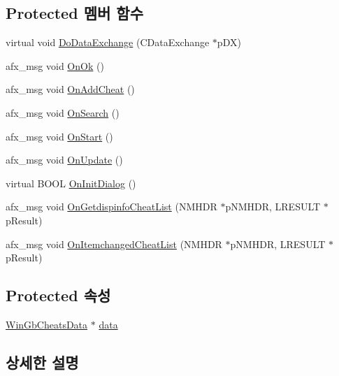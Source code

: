 \subsection*{Protected 멤버 함수}
\begin{DoxyCompactItemize}
\item 
virtual void \mbox{\hyperlink{class_g_b_cheat_search_ab867411287037dfaee49451bb149d5ad}{Do\+Data\+Exchange}} (C\+Data\+Exchange $\ast$p\+DX)
\item 
afx\+\_\+msg void \mbox{\hyperlink{class_g_b_cheat_search_a8a4503d0b05a2061a281f01b6e23f586}{On\+Ok}} ()
\item 
afx\+\_\+msg void \mbox{\hyperlink{class_g_b_cheat_search_acd735709495f4e21e284a4442886152a}{On\+Add\+Cheat}} ()
\item 
afx\+\_\+msg void \mbox{\hyperlink{class_g_b_cheat_search_acdfee4ab94748a31036cd473c60a4573}{On\+Search}} ()
\item 
afx\+\_\+msg void \mbox{\hyperlink{class_g_b_cheat_search_add94032f04d4e03bee943d9a7051df20}{On\+Start}} ()
\item 
afx\+\_\+msg void \mbox{\hyperlink{class_g_b_cheat_search_a9e91910287e7ff53576af9b32de875ad}{On\+Update}} ()
\item 
virtual B\+O\+OL \mbox{\hyperlink{class_g_b_cheat_search_a8aba3602d876fba97b2ef5195dc0b648}{On\+Init\+Dialog}} ()
\item 
afx\+\_\+msg void \mbox{\hyperlink{class_g_b_cheat_search_ae7ab3b9b14715f3984bdef66ed321e1f}{On\+Getdispinfo\+Cheat\+List}} (N\+M\+H\+DR $\ast$p\+N\+M\+H\+DR, L\+R\+E\+S\+U\+LT $\ast$p\+Result)
\item 
afx\+\_\+msg void \mbox{\hyperlink{class_g_b_cheat_search_af1edf086e30536c43b13528e4114ebc2}{On\+Itemchanged\+Cheat\+List}} (N\+M\+H\+DR $\ast$p\+N\+M\+H\+DR, L\+R\+E\+S\+U\+LT $\ast$p\+Result)
\end{DoxyCompactItemize}
\subsection*{Protected 속성}
\begin{DoxyCompactItemize}
\item 
\mbox{\hyperlink{struct_win_gb_cheats_data}{Win\+Gb\+Cheats\+Data}} $\ast$ \mbox{\hyperlink{class_g_b_cheat_search_a3b53d05af5d79a51830df8d06256e1fc}{data}}
\end{DoxyCompactItemize}


\subsection{상세한 설명}


